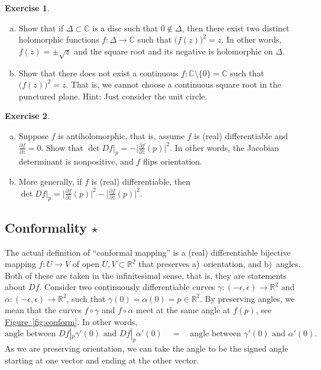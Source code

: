 \documentclass[12pt,openany]{book}
\newcommand{\babs}[1]{\bigl\lvert {#1} \bigr\rvert}
\newcommand{\C}{{\mathbb{C}}}
\newcommand{\R}{{\mathbb{R}}}
\newcommand{\myquote}[1]{``#1''}
\theoremstyle{plain}
\theoremstyle{remark}
\theoremstyle{definition}
\newenvironment{exbox}{%
    \def\FrameCommand{\vrule width 1pt \relax\hspace{10pt}}%
    \MakeFramed{\advance\hsize-\width\FrameRestore}%
}{%
    \endMakeFramed
}
\newenvironment{exparts}{%
    \leavevmode\begin{enumerate}[a),noitemsep,topsep=0pt,parsep=0pt,partopsep=0pt]
}{%
    \end{enumerate}
}
\theoremstyle{exercise}
\newtheorem{exercise}{Exercise}[section]
\theoremstyle{example}
\newcommand{\figureref}[1]{\hyperref[#1]{Figure~\ref*{#1}}}
\begin{document}
\begin{exbox}
\begin{exercise}
\begin{exparts}
\item
Show that if $\Delta \subset \C$ is a disc such that $0 \notin \Delta$, then
there exist two distinct holomorphic functions $f \colon \Delta \to \C$ such that
${\bigl(f(z)\bigr)}^2 = z$.  In other words, $f(z) = \pm \sqrt{z}$ and the
square root and its negative is holomorphic on $\Delta$.
\item
Show that there does not exist a continuous $f \colon \C \setminus \{ 0 \} =
\C$ such that ${\bigl(f(z)\bigr)}^2 = z$.  That is, we cannot choose a
continuous square root in the punctured plane.  Hint: Just consider the unit
circle.
\end{exparts}
\end{exercise}

\begin{exercise}
\begin{exparts}
\item
Suppose $f$ is antiholomorphic, that is, assume $f$ is (real) differentiable
and $\frac{\partial f}{\partial z} = 0$.  Show that
$\det Df\big|_p = - \babs{\frac{\partial f}{\partial \bar{z}}(p)}^2$.  In other words,
the Jacobian determinant is nonpositive, and $f$ flips orientation.
\item
More generally, if $f$ is (real) differentiable, then
$\det Df\big|_p = \babs{\frac{\partial f}{\partial z}(p)}^2 -
\babs{\frac{\partial f}{\partial \bar{z}}(p)}^2$.
\end{exparts}
\end{exercise}
\end{exbox}

\subsection{Conformality \texorpdfstring{$\star$}{*}}

The actual definition of \myquote{conformal mapping} is 
a (real) differentiable bijective mapping $f \colon U \to V$ of open
$U, V \subset \R^2$ that preserves
a)~orientation, and b)~angles.
Both of these are taken in the infinitesimal sense, that is, they are
statements about $Df$.  Consider two continuously differentiable curves
$\gamma \colon (-\epsilon,\epsilon) \to \R^2$ and
$\alpha \colon (-\epsilon,\epsilon) \to \R^2$, such that
$\gamma(0)=\alpha(0) = p \in \R^2$.  By preserving angles, we
mean that the curves $f \circ \gamma$ and $f \circ \alpha$ meet at the same
angle at $f(p)$, see \figureref{fig:conform}.  In other words,
\begin{equation*}
\text{angle between } Df|_p \gamma'(0) \text{ and }
Df|_p \alpha'(0)
\quad = \quad
\text{angle between } \gamma'(0) \text{ and } \alpha'(0) .
\end{equation*}
As we are preserving orientation,
we can take the angle to be the signed angle starting at one vector and
ending at the other vector. 
\end{document}
